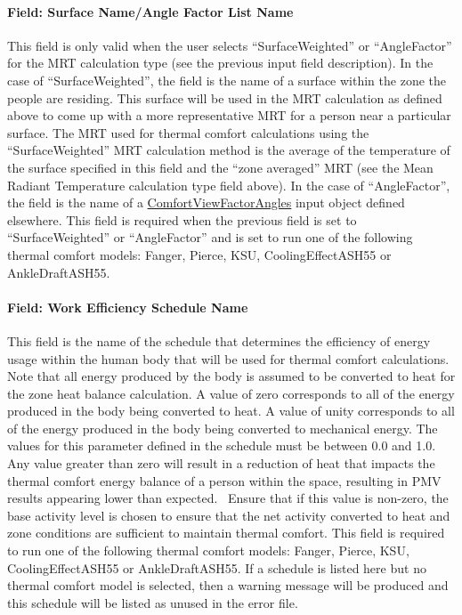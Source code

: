 \paragraph{Field: Surface Name/Angle Factor List Name}\label{field-surface-nameangle-factor-list-name}

This field is only valid when the user selects ``SurfaceWeighted'' or ``AngleFactor'' for the MRT calculation type (see the previous input field description). In the case of ``SurfaceWeighted'', the field is the name of a surface within the zone the people are residing. This surface will be used in the MRT calculation as defined above to come up with a more representative MRT for a person near a particular surface. The MRT used for thermal comfort calculations using the ``SurfaceWeighted'' MRT calculation method is the average of the temperature of the surface specified in this field and the ``zone averaged'' MRT (see the Mean Radiant Temperature calculation type field above). In the case of ``AngleFactor'', the field is the name of a \hyperref[comfortviewfactorangles]{ComfortViewFactorAngles} input object defined elsewhere. This field is required when the previous field is set to ``SurfaceWeighted'' or ``AngleFactor'' and is set to run one of the following thermal comfort models: Fanger, Pierce, KSU, CoolingEffectASH55 or AnkleDraftASH55.

\paragraph{Field: Work Efficiency Schedule Name}\label{field-work-efficiency-schedule-name}

This field is the name of the schedule that determines the efficiency of energy usage within the human body that will be used for thermal comfort calculations. Note that all energy produced by the body is assumed to be converted to heat for the zone heat balance calculation. A value of zero corresponds to all of the energy produced in the body being converted to heat. A value of unity corresponds to all of the energy produced in the body being converted to mechanical energy. The values for this parameter defined in the schedule must be between 0.0 and 1.0. Any value greater than zero will result in a reduction of heat that impacts the thermal comfort energy balance of a person within the space, resulting in PMV results appearing lower than expected.~ Ensure that if this value is non-zero, the base activity level is chosen to ensure that the net activity converted to heat and zone conditions are sufficient to maintain thermal comfort. This field is required to run one of the following thermal comfort models: Fanger, Pierce, KSU, CoolingEffectASH55 or AnkleDraftASH55. If a schedule is listed here but no thermal comfort model is selected, then a warning message will be produced and this schedule will be listed as unused in the error file.

